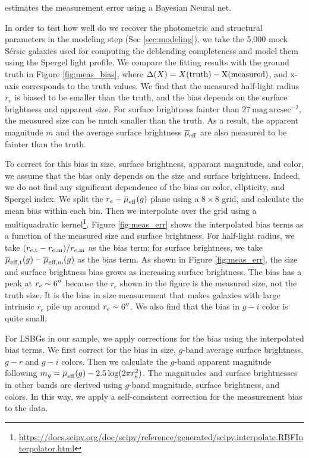 \documentclass[twocolumn,astrosymb,twocolappendix]{aastex631}
\newcommand{\sbunit}{\mathrm{mag\ arcsec}^{-2}}
\newcommand{\sersic}{S\'ersic}
\begin{document}
\begin{CJK*}{UTF8}{gbsn}
\citet{Tanoglidis2022ICML} estimates the measurement error using a Bayesian Neural net. 

In order to test how well do we recover the photometric and structural parameters in the modeling step (Sec \ref{sec:modeling}), we take the 5,000 mock \sersic{} galaxies used for computing the deblending completeness and model them using the Spergel light profile. We compare the fitting results with the ground truth in Figure \ref{fig:meas_bias}, where $\Delta(X) = X(\rm truth) - X(\rm measured)$, and x-axis corresponds to the truth values. We find that the measured half-light radius $r_e$ is biased to be smaller than the truth, and the bias depends on the surface brightness and apparent size. For surface brightness fainter than $27\ \sbunit$, the measured size can be much smaller than the truth. As a result, the apparent magnitude $m$ and the average surface brightness $\overline{\mu}_{\rm eff}$ are also measured to be fainter than the truth. 

To correct for this bias in size, surface brightness, apparant magnitude, and color, we assume that the bias only depends on the size and surface brightness. Indeed, we do not find any significant dependence of the bias on color, ellpticity, and Spergel index. We split the $r_e-\overline{\mu}_{\rm eff}(g)$ plane using a $8\times 8$ grid, and calculate the mean bias within each bin. Then we interpolate over the grid using a multiquadratic kernel\footnote{\url{https://docs.scipy.org/doc/scipy/reference/generated/scipy.interpolate.RBFInterpolator.html}}. Figure \ref{fig:meas_err} shows the interpolated bias terms as a function of the measured size and surface brightness. For half-light radius, we take $(r_{e, \rm t} - r_{e, \rm m}) / r_{e,\rm m}$ as the bias term; for surface brightness, we take $\overline{\mu}_{\rm eff, t}(g) - \overline{\mu}_{\rm eff, m}(g)$ as the bias term. As shown in Figure \ref{fig:meas_err}, the size and surface brightness bias grows as increasing surface brightness. The bias has a peak at $r_e\sim 6\mbox{$^{\prime\prime}$}$ because the $r_e$ shown in the figure is the measured size, not the truth size. It is the bias in size measurement that makes galaxies with large intrinsic $r_e$ pile up around $r_e\sim 6\mbox{$^{\prime\prime}$}$. We also find that the bias in $g-i$ color is quite small. 

For LSBGs in our sample, we apply corrections for the bias using the interpolated bias terms. We first correct for the bias in size, $g$-band average surface brightness, $g-r$ and $g-i$ colors. Then we calculate the $g$-band apparent magnitude following $m_g = \overline{\mu}_{\rm eff}(g) - 2.5\log(2\pi r_e^2)$. The magnitudes and surface brightnesses in other bands are derived using $g$-band magnitude, surface brightness, and colors. In this way, we apply a self-consistent correction for the measurement bias to the data. 


\end{CJK*}
\end{document}
